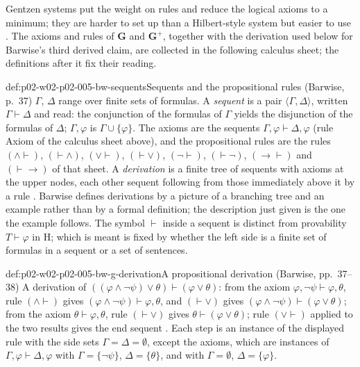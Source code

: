 Gentzen systems put the weight on rules and reduce the logical axioms to a
minimum; they are harder to set up than a Hilbert-style system but easier
to use \cite[ch.~A.1, \S4, p.~37]{Barwise1977FirstOrder}.  The axioms
and rules of \(\mathbf G\) and \(\mathbf G^{+}\), together with the
derivation used below for Barwise's third derived claim, are collected in
the following calculus sheet; the definitions after it fix their reading.


\begin{hbdefinition}{def:p02-w02-p02-005-bw-sequents}{Sequents and the propositional rules (Barwise, p.~37)}
\(\Gamma\), \(\Delta\) range over finite sets of formulas.  A \emph{sequent}
is a pair \(\langle\Gamma,\Delta\rangle\), written \(\Gamma\vdash\Delta\)
and read: the conjunction of the formulas of \(\Gamma\) yields the
disjunction of the formulas of \(\Delta\); \(\Gamma,\varphi\) is
\(\Gamma\cup\{\varphi\}\).  The axioms are the sequents
\(\Gamma,\varphi\vdash\Delta,\varphi\) (rule Axiom of the calculus sheet
above), and the propositional rules are the rules \((\land\vdash)\),
\((\vdash\land)\), \((\lor\vdash)\), \((\vdash\lor)\), \((\neg\vdash)\),
\((\vdash\neg)\), \((\to\vdash)\) and \((\vdash\to)\) of that sheet.
A \emph{derivation} is a finite tree of sequents with axioms at the upper
nodes, each other sequent following from those immediately above it by a
rule \cite[ch.~A.1, \S4, p.~37]{Barwise1977FirstOrder}.  Barwise defines
derivations by a picture of a branching tree and an example rather than by
a formal definition; the description just given is the one the example
follows.  The symbol \(\vdash\) inside a sequent is distinct from
provability \(T\vdash\varphi\) in H; which is meant is fixed by whether the
left side is a finite set of formulas in a sequent or a set of sentences.
\end{hbdefinition}

\begin{hbexample}{def:p02-w02-p02-005-bw-g-derivation}{A propositional derivation (Barwise, pp.~37--38)}
A derivation of \(((\varphi\land\neg\psi)\lor\theta)\vdash(\varphi\lor\theta)\):
from the axiom \(\varphi,\neg\psi\vdash\varphi,\theta\), rule
\((\land\vdash)\) gives \((\varphi\land\neg\psi)\vdash\varphi,\theta\), and
\((\vdash\lor)\) gives \((\varphi\land\neg\psi)\vdash(\varphi\lor\theta)\);
from the axiom \(\theta\vdash\varphi,\theta\), rule \((\vdash\lor)\) gives
\(\theta\vdash(\varphi\lor\theta)\); rule \((\lor\vdash)\) applied to the
two results gives the end sequent
\cite[ch.~A.1, \S4, p.~38]{Barwise1977FirstOrder}.  Each step is an
instance of the displayed rule with the side sets \(\Gamma=\Delta=\emptyset\),
except the axioms, which are instances of
\(\Gamma,\varphi\vdash\Delta,\varphi\) with \(\Gamma=\{\neg\psi\}\),
\(\Delta=\{\theta\}\), and with \(\Gamma=\emptyset\), \(\Delta=\{\varphi\}\).
\end{hbexample}

